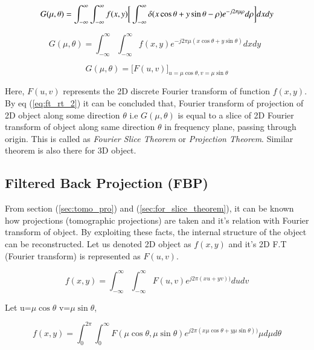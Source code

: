 \documentclass[twoside]{iitbreport}
\begin{document}
\begin{equation}
G(\mu,\theta) = \int_{-\infty}^{\infty} \int_{-\infty}^{\infty} f(x,y) \bigg[ \int_{-\infty}^{\infty} \delta(x\cos\theta+y\sin\theta - \rho)  e^{-j2\pi\mu\rho} d\rho \bigg] dxdy \\
\end{equation}

\begin{equation}
G(\mu,\theta) = \int_{-\infty}^{\infty} \int_{-\infty}^{\infty} f(x,y) e^{-j2\pi\mu(x\cos\theta+y\sin\theta)} dxdy \enspace
\end{equation}


\begin{equation}\label{eq:ft_rt_2}
G(\mu,\theta) = \big[F(u,v)\big]_{u=\mu\cos\theta,v=\mu\sin\theta}
\end{equation}

\noindent
Here, $F(u,v)$ represents the 2D discrete Fourier transform of function $f(x,y)$. By eq (\ref{eq:ft_rt_2}) it can be concluded that, Fourier transform of projection of 2D object along some direction $\theta$ i.e $G(\mu,\theta)$ is equal to a slice of 2D Fourier transform of object along same direction $\theta$ in frequency plane, passing through origin. This is called as \textit{Fourier Slice Theorem} or \textit{Projection Theorem}. Similar theorem is also there for 3D object.

\subsection{Filtered Back Projection (FBP)}\label{subsec:reconst_fbp}
From section (\ref{sec:tomo_pro}) and (\ref{sec:for_slice_theorem}), it can be known how projections (tomographic projections) are taken and it's relation with Fourier transform of object. By exploiting these facts, the internal structure of the object can be reconstructed. Let us denoted 2D object as $f(x,y)$ and it's 2D F.T (Fourier transform) is represented as $F(u,v)$.

\begin{equation}\label{eq:inv_ft}
f(x,y) = \int_{-\infty}^{\infty} \int_{-\infty}^{\infty} F(u,v) e^{j2\pi(xu+yv))} dudv
\end{equation}

Let u=$\mu\cos\theta$ v=$\mu\sin\theta$,

\begin{equation}
f(x,y) = \int_{0}^{2\pi} \int_{0}^{\infty} F(\mu\cos\theta,\mu\sin\theta) e^{j2\pi(x\mu\cos\theta+y\mu\sin\theta))} \mu d\mu d\theta
\end{equation}
\end{document}
